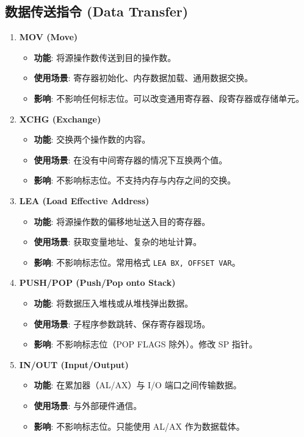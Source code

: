 \documentclass[12pt,a4paper]{ctexart}
\begin{document}
\subsection{数据传送指令 (Data Transfer)}
\begin{enumerate}
    \item \textbf{MOV (Move)}
    \begin{itemize}
        \item \textbf{功能}: 将源操作数传送到目的操作数。
        \item \textbf{使用场景}: 寄存器初始化、内存数据加载、通用数据交换。
        \item \textbf{影响}: 不影响任何标志位。可以改变通用寄存器、段寄存器或存储单元。
    \end{itemize}
    \item \textbf{XCHG (Exchange)}
    \begin{itemize}
        \item \textbf{功能}: 交换两个操作数的内容。
        \item \textbf{使用场景}: 在没有中间寄存器的情况下互换两个值。
        \item \textbf{影响}: 不影响标志位。不支持内存与内存之间的交换。
    \end{itemize}
    \item \textbf{LEA (Load Effective Address)}
    \begin{itemize}
        \item \textbf{功能}: 将源操作数的偏移地址送入目的寄存器。
        \item \textbf{使用场景}: 获取变量地址、复杂的地址计算。
        \item \textbf{影响}: 不影响标志位。常用格式 \texttt{LEA BX, OFFSET VAR}。
    \end{itemize}
    \item \textbf{PUSH/POP (Push/Pop onto Stack)}
    \begin{itemize}
        \item \textbf{功能}: 将数据压入堆栈或从堆栈弹出数据。
        \item \textbf{使用场景}: 子程序参数跳转、保存寄存器现场。
        \item \textbf{影响}: 不影响标志位（POP FLAGS 除外）。修改 SP 指针。
    \end{itemize}
    \item \textbf{IN/OUT (Input/Output)}
    \begin{itemize}
        \item \textbf{功能}: 在累加器（AL/AX）与 I/O 端口之间传输数据。
        \item \textbf{使用场景}: 与外部硬件通信。
        \item \textbf{影响}: 不影响标志位。只能使用 AL/AX 作为数据载体。
    \end{itemize}
\end{enumerate}
\end{document}

